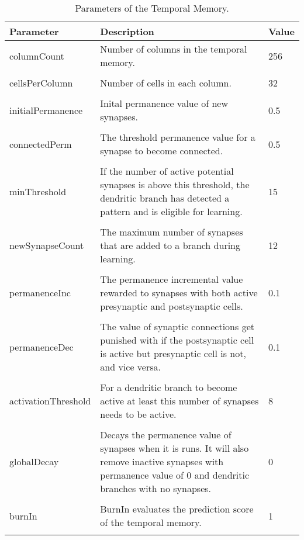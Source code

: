 \begin{table}[H]
\centering
\caption{Parameters of the Temporal Memory.}
\tiny
\label{tab:TMparams}
\begin{tabularx}{\textwidth}{l p{7.5cm} l}
\toprule
Parameter & Description &  Value\\
\midrule
        columnCount & Number of columns in the temporal memory. & 256\\
        &&\\
        cellsPerColumn & Number of cells in each column. & 32\\
        &&\\
        initialPermanence & Inital permanence value of new synapses. &0.5\\
        &&\\
        connectedPerm & The threshold permanence value for a synapse to become connected. & 0.5\\
        &&\\
        minThreshold & If the number of active potential synapses is above this threshold, the dendritic branch has detected a pattern and is eligible for learning. & 15\\
        &&\\
        newSynapseCount & The maximum number of synapses that are added to a branch during learning. & 12\\
        &&\\
        permanenceInc & The permanence incremental value rewarded to synapses with both active presynaptic and postsynaptic cells. & 0.1\\
        &&\\
        permanenceDec & The value of synaptic connections get punished with if the postsynaptic cell is active but presynaptic cell is not, and vice versa. & 0.1\\
        &&\\
        activationThreshold & For a dendritic branch to become active at least this number of synapses needs to be active. & 8\\
        &&\\
        globalDecay & Decays the permanence value of synapses when it is runs. It will also remove inactive synapses with permanence value of 0 and dendritic branches with no synapses. & 0\\
        &&\\
        burnIn & BurnIn evaluates the prediction score of the temporal memory. & 1\\
        &&\\

\end{tabularx}
\end{table}
